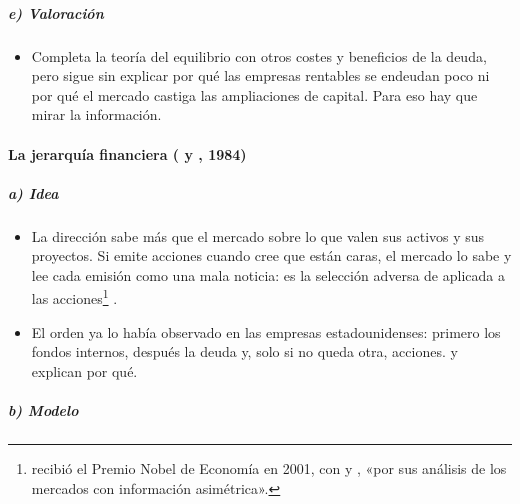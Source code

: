 \documentclass[11pt]{article}
\begin{document}
\subparagraph{e) Valoración}

\begin{itemize}
\item Completa la teoría del equilibrio con otros costes y beneficios de la deuda, pero sigue sin explicar por qué las empresas rentables se endeudan poco ni por qué el mercado castiga las ampliaciones de capital. Para eso hay que mirar la información.
\end{itemize}

\paragraph{La jerarquía financiera ( y , 1984)}

\subparagraph{a) Idea}

\begin{itemize}
\item La dirección sabe más que el mercado sobre lo que valen sus activos y sus proyectos. Si emite acciones cuando cree que están caras, el mercado lo sabe y lee cada emisión como una mala noticia\nocite{MyersMajluf1984Corporate}: es la selección adversa de  aplicada a las acciones\footnote{ recibió el Premio Nobel de Economía en 2001, con  y , «por sus análisis de los mercados con información asimétrica»\nocite{Nobel2001AkerlofSpenceStiglitz}.} .
\item El orden ya lo había observado \textcite{Donaldson1961Corporate} en las empresas estadounidenses: primero los fondos internos, después la deuda y, solo si no queda otra, acciones.  y  explican por qué.
\end{itemize}

\subparagraph{b) Modelo}
\end{document}
